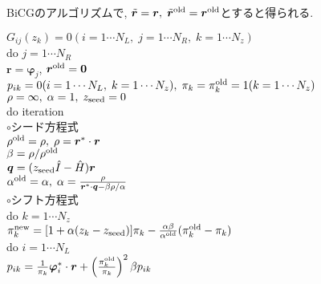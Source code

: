 \documentclass[12pt,titlepage]{jarticle}
\begin{document}
BiCGのアルゴリズムで, ${\tilde {\boldsymbol r}} = {\boldsymbol r},\; 
{\tilde {\boldsymbol r}}^{\rm old} = {\boldsymbol r}^{\rm old}$とすると得られる.

\noindent
$G_{i j}(z_k) = 0 (i=1 \cdots N_L,\; j = 1 \cdots N_R,\; k=1 \cdots N_z)$
\\
do $j = 1 \cdots N_R$
\\\hspace{0.5cm}
${\boldsymbol r} = {\boldsymbol \varphi_j}$, 
${\boldsymbol r}^{\rm old} = {\bf 0}$
\\\hspace{0.5cm}
$p_{i k} = 0(i=1 \cdots N_L,\; k=1 \cdots N_z),\; \pi_k=\pi_k^{\rm old} = 1(k=1 \cdots N_z)$ 
\\\hspace{0.5cm}
$\rho = \infty,\; \alpha = 1,\; z_{\rm seed}=0$ 
\\\hspace{0.5cm}
do iteration
\\\hspace{1.0cm}
$\circ$シード方程式
\\\hspace{1.0cm}
$\rho^{\rm old} = \rho,\; \rho = {\boldsymbol r}^* \cdot {\boldsymbol r}$
\\\hspace{1.0cm}
$\beta = \rho / \rho^{\rm old}$
\\\hspace{1.0cm}
${\boldsymbol q} = (z_{\rm seed} {\hat I} - {\hat H}){\boldsymbol r}$
\\\hspace{1.0cm}
$\alpha^{\rm old} = \alpha,\; 
\alpha = \frac{\rho}{{\boldsymbol r}^* \cdot {\boldsymbol q} - \beta \rho / \alpha }$
\\\hspace{1.0cm}
$\circ$シフト方程式
\\\hspace{1.0cm}
do $k = 1 \cdots N_z$
\\\hspace{1.5cm}
$\pi_k^{\rm new} = [1+\alpha(z_k-z_{\rm seed})]\pi_k - \frac{\alpha \beta}{\alpha^{\rm old}}(\pi_k^{\rm old} - \pi_k)$
\\\hspace{1.5cm}
do $i = 1 \cdots N_L$
\\\hspace{2.0cm}
$p_{i k} = \frac{1}{\pi_k} {\boldsymbol \varphi}_i^* \cdot {\boldsymbol r} + 
\left(\frac{\pi^{\rm old}_k}{\pi_k } \right)^2 \beta p_{i k}$
\\\hspace{2.0cm}
\end{document}
